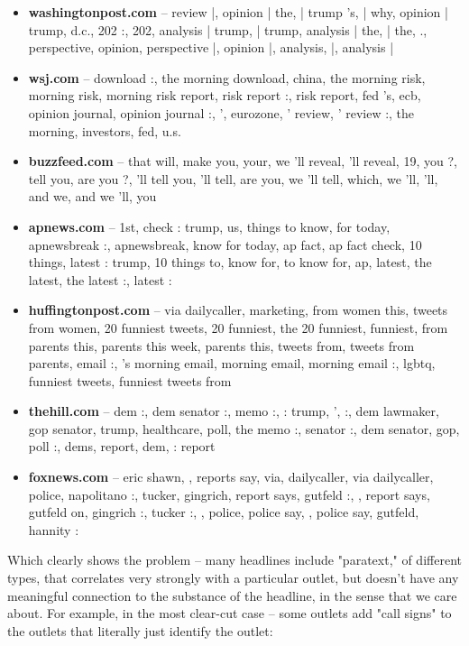 \documentclass{scrartcl}
\begin{document}
\begin{itemize}
\item \textbf{washingtonpost.com} -- review |, opinion | the, | trump 's, | why, opinion | trump, d.c., 202 :, 202, analysis | trump, | trump, analysis | the, | the, ., perspective, opinion, perspective |, opinion |, analysis, |, analysis |

\item \textbf{wsj.com} -- download :, the morning download, china, the morning risk, morning risk, morning risk report, risk report :, risk report, fed 's, ecb, opinion journal, opinion journal :, ', eurozone, ' review, ' review :, the morning, investors, fed, u.s.
%
\item \textbf{buzzfeed.com} -- that will, make you, your, we 'll reveal, 'll reveal, 19, you ?, tell you, are you ?, 'll tell you, 'll tell, are you, we 'll tell, which, we 'll, 'll, and we, and we 'll, you

\item \textbf{apnews.com} -- 1st, check : trump, us, things to know, for today, apnewsbreak :, apnewsbreak, know for today, ap fact, ap fact check, 10 things, latest : trump, 10 things to, know for, to know for, ap, latest, the latest, the latest :, latest :

\item \textbf{huffingtonpost.com} -- via dailycaller, marketing, from women this, tweets from women, 20 funniest tweets, 20 funniest, the 20 funniest, funniest, from parents this, parents this week, parents this, tweets from, tweets from parents, email :, 's morning email, morning email, morning email :, lgbtq, funniest tweets, funniest tweets from

\item \textbf{thehill.com} -- dem :, dem senator :, memo :, : trump, ', :, dem lawmaker, gop senator, trump, healthcare, poll, the memo :, senator :, dem senator, gop, poll :, dems, report, dem, : report

\item \textbf{foxnews.com} -- eric shawn, , reports say, via, dailycaller, via dailycaller, police, napolitano :, tucker, gingrich, report says, gutfeld :, , report says, gutfeld on, gingrich :, tucker :, , police, police say, , police say, gutfeld, hannity :
\end{itemize}

Which clearly shows the problem -- many headlines include "paratext," of different types, that correlates very strongly with a particular outlet, but doesn't have any meaningful connection to the substance of the headline, in the sense that we care about. For example, in the most clear-cut case -- some outlets add "call signs" to the outlets that literally just identify the outlet:
\end{document}
